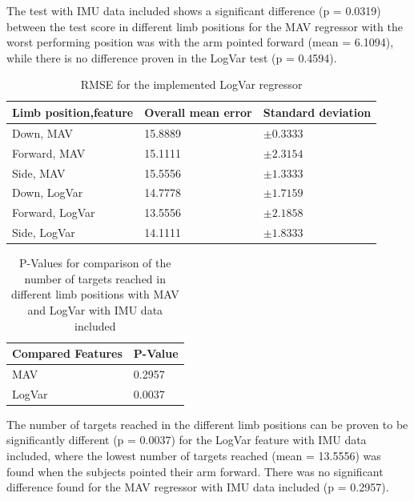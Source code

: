 	The test with IMU data included shows a significant difference (p = 0.0319) between the test score in different limb positions for the MAV regressor with the worst performing position was with the arm pointed forward (mean = 6.1094), while there is no difference proven in the LogVar test (p = 0.4594).
	
	\begin{table}[!thpb]
		\begin{center}
			\begin{tabular}{l l l}
				\hline
				\textbf{Limb position,feature} & \textbf{Overall mean error} & \textbf{Standard deviation}\\
				\hline
				Down, MAV & 15.8889 & $\pm 0.3333$ \\
				Forward, MAV & 15.1111 & $\pm 2.3154$ \\
				Side, MAV & 15.5556 & $\pm 1.3333$ \\
				Down, LogVar & 14.7778 & $\pm 1.7159$ \\
				Forward, LogVar & 13.5556 & $\pm 2.1858$ \\
				Side, LogVar & 14.1111 & $\pm 1.8333$ \\
				\hline
			\end{tabular}
			\caption{RMSE for the implemented LogVar regressor}
		\end{center}
	\end{table}
	
	\begin{table}[!thpb]
		\begin{center}
			\begin{tabular}{l l}
				\hline
				\textbf{Compared Features} & \textbf{P-Value}\\
				\hline
				MAV & 0.2957 \\
				LogVar & 0.0037 \\
				\hline
			\end{tabular}
			\caption{P-Values for comparison of the number of targets reached in different limb positions with MAV and LogVar with IMU data included}
		\end{center}
	\end{table}
	
	The number of targets reached in the different limb positions can be proven to be significantly different (p = 0.0037) for the LogVar feature with IMU data included, where the lowest number of targets reached (mean = 13.5556) was found when the subjects pointed their arm forward. There was no significant difference found for the MAV regressor with IMU data included (p = 0.2957).
	
